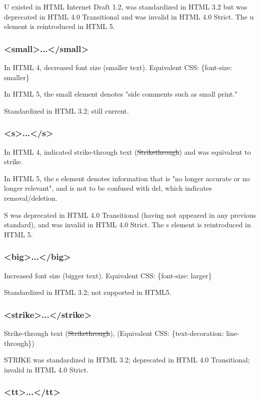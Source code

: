 U existed in HTML Internet Draft 1.2, was standardized in HTML 3.2 but was deprecated in HTML 4.0 Transitional and was invalid in HTML 4.0 Strict. The u element is reintroduced in HTML 5.


\subsubsection{<small>...</small>}

In HTML 4, decreased font size (smaller text). Equivalent CSS: \{font-size: smaller\}

In HTML 5, the small element denotes "side comments such as small print."

Standardized in HTML 3.2; still current.

\subsubsection{<s>...</s>}

In HTML 4, indicated strike-through text (\sout{Strikethrough}) and was equivalent to strike.

In HTML 5, the s element denotes information that is "no longer accurate or no longer relevant", and is not to be confused with del, which indicates removal/deletion.

S was deprecated in HTML 4.0 Transitional (having not appeared in any previous standard), and was invalid in HTML 4.0 Strict. The s element is reintroduced in HTML 5.

\subsubsection{<big>...</big>}

Increased font size (bigger text). Equivalent CSS: \{font-size: larger\}

Standardized in HTML 3.2; not supported in HTML5.


\subsubsection{<strike>...</strike>}


Strike-through text (\sout{Strikethrough}), (Equivalent CSS: \{text-decoration: line-through\})

STRIKE was standardized in HTML 3.2; deprecated in HTML 4.0 Transitional; invalid in HTML 4.0 Strict.


\subsubsection{<tt>...</tt>}

